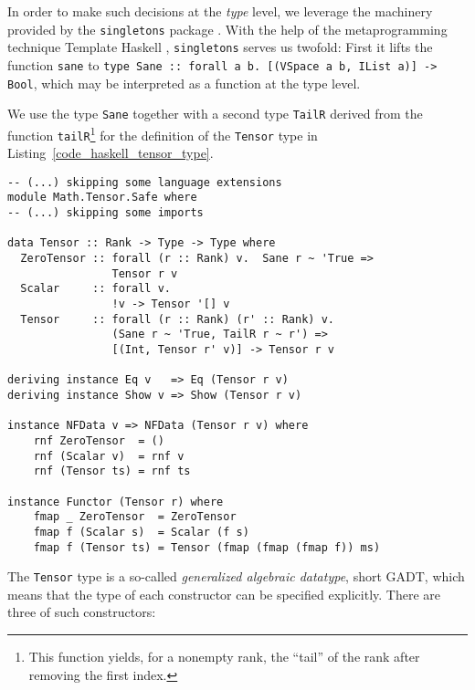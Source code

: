 In order to make such decisions at the \emph{type} level, we leverage the machinery provided by the \texttt{singletons} package \cite{Eisenberg_2012}. With the help of the metaprogramming technique Template Haskell \cite{Sheard_2002}, \texttt{singletons} serves us twofold: First it lifts the function \texttt{sane} to \texttt{type Sane :: forall a b. [(VSpace a b, IList a)] -> Bool}, which may be interpreted as a function at the type level.

We use the type \texttt{Sane} together with a second type \texttt{TailR} derived from the function \texttt{tailR}\footnote{This function yields, for a nonempty rank, the ``tail'' of the rank after removing the first index.} for the definition of the \texttt{Tensor} type in Listing~\ref{code_haskell_tensor_type}.
\begin{code}
  \begin{verbatim}
-- (...) skipping some language extensions
module Math.Tensor.Safe where
-- (...) skipping some imports

data Tensor :: Rank -> Type -> Type where
  ZeroTensor :: forall (r :: Rank) v.  Sane r ~ 'True =>
                Tensor r v
  Scalar     :: forall v.
                !v -> Tensor '[] v
  Tensor     :: forall (r :: Rank) (r' :: Rank) v.
                (Sane r ~ 'True, TailR r ~ r') =>
                [(Int, Tensor r' v)] -> Tensor r v

deriving instance Eq v   => Eq (Tensor r v)
deriving instance Show v => Show (Tensor r v)

instance NFData v => NFData (Tensor r v) where
    rnf ZeroTensor  = ()
    rnf (Scalar v)  = rnf v
    rnf (Tensor ts) = rnf ts

instance Functor (Tensor r) where
    fmap _ ZeroTensor  = ZeroTensor
    fmap f (Scalar s)  = Scalar (f s)
    fmap f (Tensor ts) = Tensor (fmap (fmap (fmap f)) ms)
  \end{verbatim}
  \label{code_haskell_tensor_type}
\end{code}
The \texttt{Tensor} type is a so-called \emph{generalized algebraic datatype}, short GADT, which means that the type of each constructor can be specified explicitly. There are three of such constructors:
